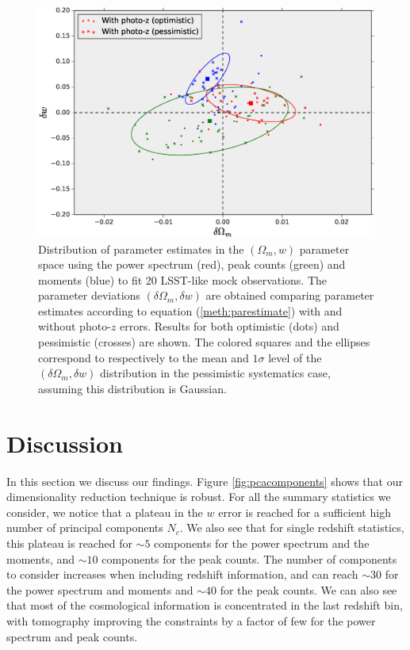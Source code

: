 \documentclass[reprint,aps,prd,superscriptaddress,showkeys,showpacs]{revtex4-1}
\begin{document}
\begin{figure}
\includegraphics[scale=0.3]{Figures/photoz_bias.eps}
\caption{Distribution of parameter estimates in the $(\Omega_m,w)$ parameter space using the power spectrum (red), peak counts (green) and moments (blue) to fit 20 LSST-like mock observations. The parameter deviations $(\delta\Omega_m,\delta w)$ are obtained comparing parameter estimates according to equation (\ref{meth:parestimate}) with and without photo-$z$ errors. Results for both optimistic (dots) and pessimistic (crosses) are shown. The colored squares and the ellipses correspond to respectively to the mean and $1\sigma$ level of the $(\delta\Omega_m,\delta w)$ distribution in the pessimistic systematics case, assuming this distribution is Gaussian.}
\label{fig:photozbias}
\end{figure}


\section{Discussion}
In this section we discuss our findings. Figure \ref{fig:pcacomponents} shows that our dimensionality reduction technique is robust. For all the summary statistics we consider, we notice that a plateau in the $w$ error is reached for a sufficient high number of principal components $N_c$. We also see that for single redshift statistics, this plateau is reached for $\sim 5$ components for the power spectrum and the moments, and $\sim 10$ components for the peak counts. The number of components to consider increases when including redshift information, and can reach $\sim 30$ for the power spectrum and moments and $\sim 40$ for the peak counts. We can also see that most of the cosmological information is concentrated in the last redshift bin, with tomography improving the constraints by a factor of few for the power spectrum and peak counts.
\end{document}
